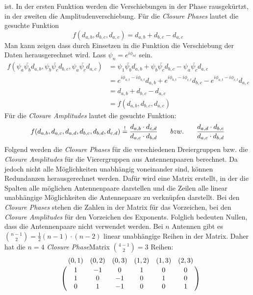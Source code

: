 ist. In der ersten Funktion werden die Verschiebungen in der Phase rausgekürtzt, in der zweiten die Amplitudenverschiebung.
Für die \emph{Closure Phases} lautet die gesuchte Funktion
\begin{equation}f(d_{a,b},d_{b,c},d_{a,c})=d_{a,b}+d_{b,c}-d_{a,c}\end{equation}
Man kann zeigen dass durch Einsetzen in die Funktion die Verschiebung der Daten herausgerechnet wird.
Lass $\psi_n = e^{i \phi_{nt}}$ sein.
\begin{align}
f(\psi_a\bar{\psi_b} d_{a,b},\psi_b\bar{\psi_c}d_{b,c},\psi_a \bar{\psi_c} d_{a,c})&=\psi_1\bar{\psi_b}d_{a,b}+\psi_b\bar{\psi_c}d_{b,c}-\psi_a \bar{\psi_c} d_{a,c}\\
&=e^{i \phi_{a,t}-i\phi_{b,t}}d_{a,b}+e^{i \phi_{b,t}-i\phi_{c,t}}d_{b,c}-e^{i \phi_{a,t}-i\phi_{c,t}}d_{a,c}\\
&=d_{a,b}+d_{b,c}-d_{a,c}\\
&=f(d_{a,b},d_{b,c},d_{a,c})
\end{align}
Für die \emph{Closure Amplitudes} lautet die gesuchte Funktion:
\begin{align}
f(d_{a, b},d_{a, c},d_{a, d},d_{b, c},d_{b, d},d_{c, d})\overset{!}{=}\frac{d_{a,b}\cdot d_{c,d}}{d_{a,c} \cdot d_{b,d}}
\hspace{3mm}\text \quad {bzw.} \quad \hspace{3mm} \frac{d_{a,d}\cdot d_{b,c}}{d_{a,c} \cdot d_{b,d}}
\end{align}
Folgend werden die \emph{Closure Phases} für die verschiedenen Dreiergruppen bzw. die \emph{Closure Amplitudes} für die Vierergruppen aus Antennenpaaren berechnet. Da jedoch nicht alle Möglichkeiten unabhängig voneinander sind, können Redundanzen herausgerechnet werden.
Dafür wird eine Matrix erstellt, in der die Spalten alle möglichen Antennenpaare darstellen und die Zeilen alle linear unabhängige Möglichkeiten die Antennepaare zu verknüpfen darstellt. Bei den  \emph{Closure Phases} stehen die Zahlen in der Matrix für das Vorzeichen, bei den \emph{Closure Amplitudes} für den Vorzeichen des Exponents. Folglich bedeuten Nullen, dass die Antennenpaare nicht verwendet werden.  Bei $n$ Antennen gibt es $\binom{n-1}{2}= \frac{1}{2}(n-1)\cdot(n-2)$ linear unabhängige Reihen in der Matrix.
Daher hat die $n=4$ \emph{Closure Phase}Matrix $\binom{4-1}{2}=3$ Reihen:
\begin{equation}
\bordermatrix{
~ &(0,1)&(0,2)&(0,3)&(1,2)&(1,3)&(2,3)\cr
~&1&-1&0&1&0&0 \cr
~&1&0&-1&0&1&0 \cr
~&0&1&-1&0&0&1 \cr}
\end{equation}
